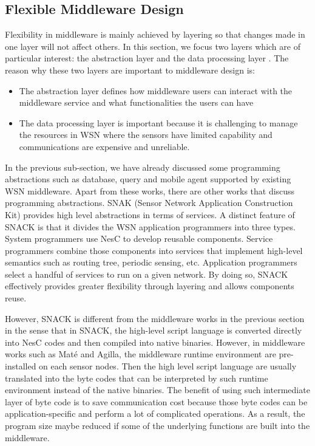 \subsection{Flexible Middleware Design}
Flexibility in middleware is mainly achieved by layering so that changes made in one layer will not affect others. In this section, we focus two layers which are of particular interest: the abstraction layer and the data processing layer \cite{layeredDesign}. The reason why these two layers are important to middleware design is:
\begin{itemize}
\item The abstraction layer defines how middleware users can interact with the middleware service and what functionalities the users can have
\item The data processing layer is important because it is challenging to manage the resources in WSN where the sensors have limited capability and communications are expensive and unreliable.
\end{itemize}

In the previous sub-section, we have already discussed some programming abstractions such as database, query and mobile agent supported by existing WSN middleware. Apart from these works, there are other works that discuss programming abstractions. SNAK (Sensor Network Application Construction Kit) \cite{snack} provides high level abstractions in terms of services. A distinct feature of SNACK is that it divides the WSN application programmers into three types. System programmers use NesC to develop reusable components. Service programmers combine those components into services that implement high-level semantics such as routing tree, periodic sensing, etc. Application programmers select a handful of services to run on a given network. By doing so, SNACK effectively provides greater flexibility through layering and allows components reuse.

However, SNACK is different from the middleware works in the previous section in the sense that in SNACK, the high-level script language is converted directly into NesC codes and then compiled into native binaries. However, in middleware works such as Mat\'{e} and Agilla, the middleware runtime environment are pre-installed on each sensor nodes. Then the high level script language are usually translated into the byte codes that can be interpreted by such runtime environment instead of the native binaries. The benefit of using such intermediate layer of byte code is to save communication cost because those byte codes can be application-specific and perform a lot of complicated operations. As a result, the program size maybe reduced if some of the underlying functions are built into the middleware.

